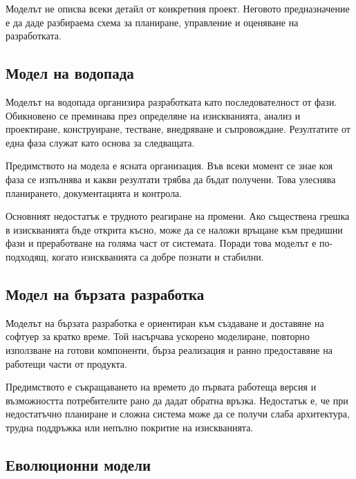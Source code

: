 Моделът не описва всеки детайл от конкретния проект. Неговото предназначение е да даде разбираема схема за планиране, управление и оценяване на разработката.

\subsection{Модел на водопада}\label{s:26.3.1}

\begin{defn}
Моделът на водопада организира разработката като последователност от фази. Обикновено се преминава през определяне на изискванията, анализ и проектиране, конструиране, тестване, внедряване и съпровождане. Резултатите от една фаза служат като основа за следващата.
\end{defn}

Предимството на модела е ясната организация. Във всеки момент се знае коя фаза се изпълнява и какви резултати трябва да бъдат получени. Това улеснява планирането, документацията и контрола.

Основният недостатък е трудното реагиране на промени. Ако съществена грешка в изискванията бъде открита късно, може да се наложи връщане към предишни фази и преработване на голяма част от системата. Поради това моделът е по-подходящ, когато изискванията са добре познати и стабилни.

\subsection{Модел на бързата разработка}\label{s:26.3.2}

\begin{defn}
Моделът на бързата разработка е ориентиран към създаване и доставяне на софтуер за кратко време. Той насърчава ускорено моделиране, повторно използване на готови компоненти, бърза реализация и ранно предоставяне на работещи части от продукта.
\end{defn}

Предимството е съкращаването на времето до първата работеща версия и възможността потребителите рано да дадат обратна връзка. Недостатък е, че при недостатъчно планиране и сложна система може да се получи слаба архитектура, трудна поддръжка или непълно покритие на изискванията.

\subsection{Еволюционни модели}\label{s:26.3.3}

